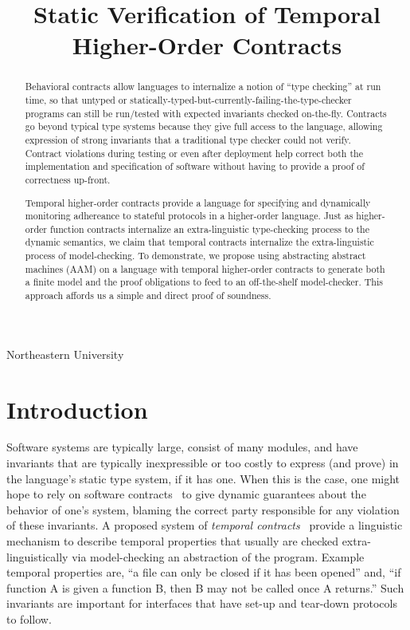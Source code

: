 \documentclass[preprint,onecolumn,9pt]{sigplanconf} %
\begin{document}
\copyrightdata{[to be supplied]}
\title{Static Verification of Temporal Higher-Order Contracts}

           {Northeastern University}
           {}
\maketitle
\begin{abstract}
  Behavioral contracts allow languages to internalize a notion of ``type checking'' at run time, so that untyped or statically-typed-but-currently-failing-the-type-checker programs can still be run/tested with expected invariants checked on-the-fly.
%
  Contracts go beyond typical type systems because they give full access to the language, allowing expression of strong invariants that a traditional type checker could not verify.
%
  Contract violations during testing or even after deployment help correct both the implementation and specification of software without having to provide a proof of correctness up-front.

  Temporal higher-order contracts provide a language for specifying and dynamically monitoring adhereance to stateful protocols in a higher-order language.
%
  Just as higher-order function contracts internalize an extra-linguistic type-checking process to the dynamic semantics, we claim that temporal contracts internalize the extra-linguistic process of model-checking.
%
  To demonstrate, we propose using abstracting abstract machines (AAM) on a language with temporal higher-order contracts to generate both a finite model and the proof obligations to feed to an off-the-shelf model-checker.
%
  This approach affords us a simple and direct proof of soundness.
\end{abstract}

\section{Introduction}

Software systems are typically large, consist of many modules, and have invariants that are typically inexpressible or too costly to express (and prove) in the language's static type system, if it has one.
%
When this is the case, one might hope to rely on software contracts~\cite{dvanhorn:Findler2002Contracts} to give dynamic guarantees about the behavior of one's system, blaming the correct party responsible for any violation of these invariants.
%
A proposed system of \emph{temporal contracts}~\citep{ianjohnson:dfm:icfp2011} provide a linguistic mechanism to describe temporal properties that usually are checked extra-linguistically via model-checking an abstraction of the program.
%
Example temporal properties are, ``a file can only be closed if it has been opened'' and, ``if function A is given a function B, then B may not be called once A returns.''
%
Such invariants are important for interfaces that have set-up and tear-down protocols to follow.
\end{document}
